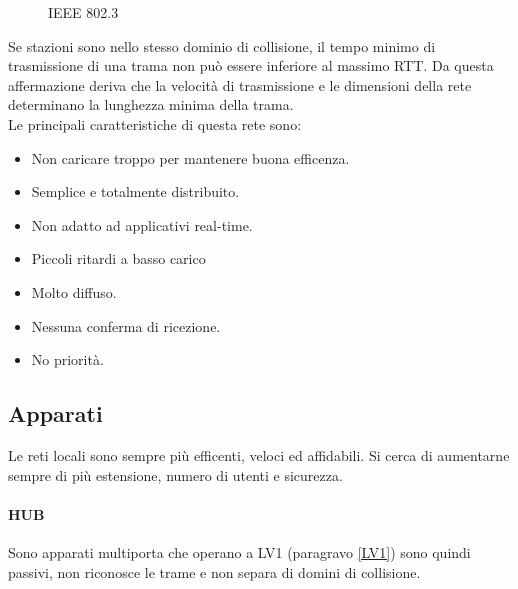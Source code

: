 \documentclass[12pt]{article}
\begin{document}
\begin{figure}[!hbpt]
\begin{minipage}{.45\textwidth}
    \caption{IEEE 802.3}
    \label{fig:ieee8023}
  \end{minipage}\hfill
\end{figure}
Se stazioni sono nello stesso dominio di collisione, il tempo minimo di trasmissione di una trama non può essere inferiore al massimo RTT. Da questa affermazione deriva che la velocità di trasmissione e le dimensioni della rete determinano la lunghezza minima della trama.\\
Le principali caratteristiche di questa rete sono:
\begin{itemize}
  \item Non caricare troppo per mantenere buona efficenza.
  \item Semplice e totalmente distribuito.
  \item Non adatto ad applicativi real-time.
  \item Piccoli ritardi a basso carico
  \item Molto diffuso.
  \item Nessuna conferma di ricezione.
  \item No priorità.
\end{itemize}
\subsection{Apparati}
Le reti locali sono sempre più efficenti, veloci ed affidabili. Si cerca di aumentarne sempre di più estensione, numero di utenti e sicurezza.
\paragraph{HUB}
Sono apparati multiporta che operano a LV1 (paragravo \ref{LV1}) sono quindi passivi, non riconosce le trame e non separa di domini di collisione.
\end{document}
